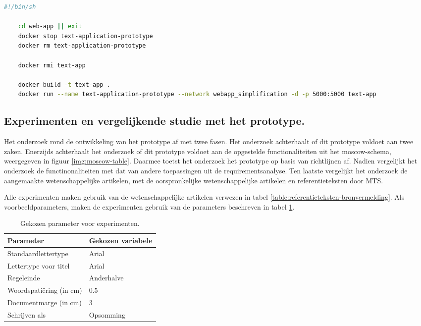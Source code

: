 \begin{lstlisting}[language=Bash, caption={Script voor het opstarten van de Docker-container voor Unix-gebruikers}, label={code:bash-boot}]
	#!/bin/sh
	
	cd web-app || exit
	docker stop text-application-prototype
	docker rm text-application-prototype
	
	docker rmi text-app
	
	docker build -t text-app .
	docker run --name text-application-prototype --network webapp_simplification -d -p 5000:5000 text-app
\end{lstlisting}


\subsection{Experimenten en vergelijkende studie met het prototype.}

Het onderzoek rond de ontwikkeling van het prototype af met twee fasen. Het onderzoek achterhaalt of dit prototype voldoet aan twee zaken. Enerzijds achterhaalt het onderzoek of dit prototype voldoet aan de opgestelde functionaliteiten uit het moscow-schema, weergegeven in figuur \ref{img:moscow-table}. Daarmee toetst het onderzoek het prototype op basis van richtlijnen af. Nadien vergelijkt het onderzoek de functinonaliteiten met dat van andere toepassingen uit de requirementsanalyse. Ten laatste vergelijkt het onderzoek de aangemaakte wetenschappelijke artikelen, met de oorspronkelijke wetenschappelijke artikelen en referentieteksten door MTS.

\medspace

Alle experimenten maken gebruik van de wetenschappelijke artikelen verwezen in tabel \ref{table:referentieteksten-bronvermelding}. Als voorbeeldparameters, maken de experimenten gebruik van de parameters beschreven in tabel \ref{table:chosen-parameters-experiment}.

\begin{table}
	\begin{tabular}{| m{5cm} | m{5cm} |}
	\hline
	\textbf{Parameter} & \textbf{Gekozen variabele} \\ \hline
	Standaardlettertype & Arial \\ \hline
	Lettertype voor titel & Arial \\ \hline
	Regeleinde & Anderhalve \\ \hline
	Woordspatiëring (in cm) & 0.5  \\ \hline
	Documentmarge (in cm) & 3 \\ \hline
	Schrijven als & Opsomming \\ \hline
	\end{tabular}
	\caption{Gekozen parameter voor experimenten.}
	\label{table:chosen-parameters-experiment}
\end{table}